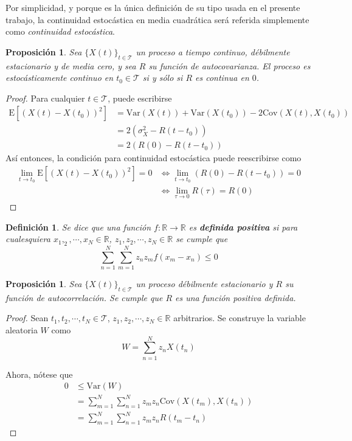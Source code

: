 \documentclass[12pt,letterpaper,draft]{book}
\newtheorem{definicion}{Definición}[chapter]
\newtheorem{proposicion}[teorema]{Proposición}
\newcommand{\R}{\mathbb{R}}
\newcommand{\E}[1]{\mathrm{E}\left[ #1 \right]}
\newcommand{\Var}[1]{\mathrm{Var}\left( #1 \right)}
\newcommand{\Cov}[1]{\mathrm{Cov}\left( #1 \right)}
\newcommand{\xt}{$\{X(t)\}_{t\in \mathcal{T}}$ }
\begin{document}
Por simplicidad, y porque es la única definición de su tipo usada en el presente trabajo, la continuidad estocástica en media cuadrática será referida simplemente como \textit{continuidad estocástica}.

\begin{proposicion}
Sea \xt un proceso a tiempo continuo, débilmente estacionario y de media cero, y sea $R$ su función de autocovarianza. El proceso es estocásticamente continuo en $t_0\in \mathcal{T}$ si y sólo si $R$ es continua en $0$.
\end{proposicion}

\begin{proof}
Para cualquier $t\in \mathcal{T}$, puede escribirse
\begin{align*}
\E{\left( X(t) - X(t_0) \right)^{2}} &= \Var{X(t)} + \Var{X(t_0)} - 2 \Cov{X(t),X(t_0)} \\
&= 2 \left( \sigma_X^{2} - R(t-t_0) \right) \\
&= 2 \left( R(0) - R(t-t_0) \right)
\end{align*}
Así entonces, la condición para continuidad estocástica puede reescribirse como
\begin{align*}
\lim_{t \rightarrow t_0} \E{\left( X(t) - X(t_0) \right)^{2}} = 0 
&\Leftrightarrow
\lim_{t \rightarrow t_0} \left( R(0) - R(t-t_0) \right) = 0 \\
&\Leftrightarrow
\lim_{\tau \rightarrow 0} R(\tau) = R(0)
\end{align*}
\end{proof}

\begin{definicion}
Se dice que una función $f: \R\rightarrow \R$ es \textbf{definida positiva} si para cualesquiera $x_1, _2, \cdots, x_N \in \R$, $z_1, z_2, \cdots, z_N \in \R$ se cumple que 
\begin{equation}
\sum_{n=1}^{N} \sum_{m=1}^{N} z_n z_m f(x_m-x_n) \leq 0
\end{equation}
\end{definicion}

\begin{proposicion}
Sea \xt un proceso débilmente estacionario y $R$ su función de autocorrelación. Se cumple que $R$ es una función positiva definida.
\end{proposicion}

\begin{proof}
Sean $t_1, t_2, \cdots, t_N \in \mathcal{T}$, $z_1, z_2, \cdots, z_N \in \R$ arbitrarios. Se construye la variable aleatoria $W$ como
\begin{equation}
W = \sum_{n=1}^{N} z_n X(t_n)
\end{equation}

Ahora, nótese que
\begin{align*}
0 &\leq \Var{W} \\
&= \sum_{m=1}^{N} \sum_{n=1}^{N} z_m z_n \Cov{X(t_m),X(t_n)} \\
&= \sum_{m=1}^{N} \sum_{n=1}^{N} z_m z_n R(t_m-t_n)
\end{align*}
\end{proof}
\end{document}
